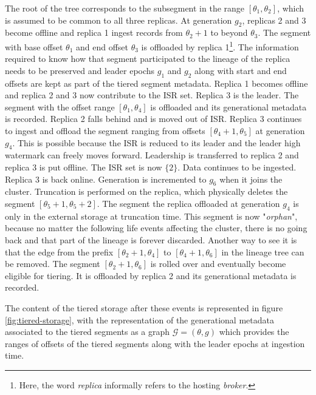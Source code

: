 \documentclass{article}
\begin{document}
\begin{outline}[enumerate]
\1 The root of the tree corresponds to the subsegment in the range $[\theta_1, \theta_2]$, which is assumed to be common to all three replicas.
\1 At generation $g_2$, replicas 2 and 3 become offline and replica 1 ingest records from $\theta_{2} + 1$ to beyond $\theta_3$. The segment with base offset $\theta_1$ and end offset $\theta_3$ is offloaded by replica 1\footnote{Here, the word \textit{replica} informally refers to the hosting \textit{broker}.}. The information required to know how that segment participated to the lineage of the replica needs to be preserved and leader epochs $g_1$ and $g_2$ along with start and end offsets are kept as part of the tiered segment metadata.
\1 Replica 1 becomes offline and replica 2 and 3 now contribute to the ISR set. Replica 3 is the leader. The segment with the offset range $[\theta_1, \theta_4]$ is offloaded and its generational metadata is recorded.
\1 Replica 2 falls behind and is moved out of ISR. Replica 3 continues to ingest and offload the segment ranging from offsets $[\theta_4 + 1, \theta_5]$ at generation $g_4$. This is possible because the ISR is reduced to its leader and the leader high watermark can freely moves forward.
\1 Leadership is transferred to replica 2 and replica 3 is put offline. The ISR set is now $\{2\}$. Data continues to be ingested.
\1 Replica 3 is back online. Generation is incremented to $g_6$ when it joins the cluster. Truncation is performed on the replica, which physically deletes the segment $[\theta_{5}+1, \theta_{5}+2]$. The segment the replica offloaded at generation $g_4$ is only in the external storage at truncation time. This segment is now "\textit{orphan}", because no matter the following life events affecting the cluster, there is no going back and that part of the lineage is forever discarded. Another way to see it is that the edge from the prefix $[\theta_2+1,\theta_4]$ to $[\theta_4+1,\theta_6]$ in the lineage tree can be removed.
\1 The segment $[\theta_2+1,\theta_6]$ is rolled over and eventually become eligible for tiering. It is offloaded by replica 2 and its generational metadata is recorded.
\end{outline}

The content of the tiered storage after these events is represented in figure \ref{fig:tiered-storage}, with the representation of the generational metadata associated to the tiered segments as a graph $\mathcal{G}=(\theta,g)$ which provides the ranges of offsets of the tiered segments along with the leader epochs at ingestion time.
\end{document}
